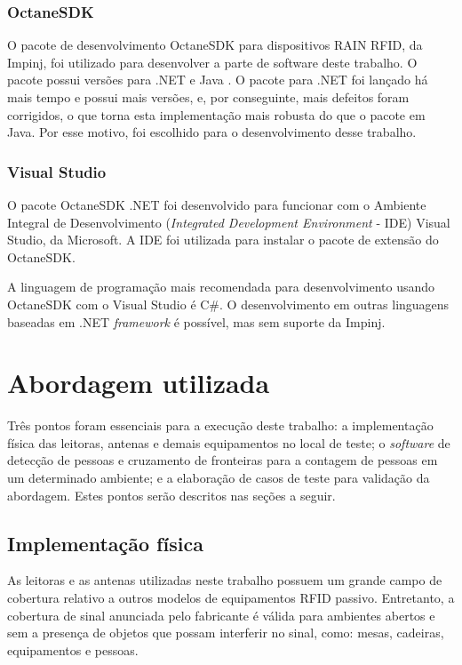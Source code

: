  \subsubsection{OctaneSDK}
 
 O pacote de desenvolvimento OctaneSDK para dispositivos RAIN RFID, da Impinj, foi utilizado para desenvolver a parte de software deste trabalho. O pacote possui versões para .NET e Java \cite{OctaneSDK}. O pacote para .NET foi lançado há mais tempo e possui mais versões, e, por conseguinte, mais defeitos foram corrigidos, o que torna esta implementação mais robusta do que o pacote em Java. Por esse motivo, foi escolhido para o desenvolvimento desse trabalho.
 
 \subsubsection{Visual Studio}
 
 O pacote OctaneSDK .NET foi desenvolvido para funcionar com o Ambiente Integral de Desenvolvimento (\textit{Integrated Development Environment} - IDE) Visual Studio, da Microsoft. A IDE foi utilizada para instalar o pacote de extensão do OctaneSDK. \cite{OctaneSDK}
 
 A linguagem de programação mais recomendada para desenvolvimento usando OctaneSDK com o Visual Studio é C\#. O desenvolvimento em outras linguagens baseadas em .NET \textit{framework} é possível, mas sem suporte da Impinj.

 
 \section{Abordagem utilizada}
 
 Três pontos foram essenciais para a execução deste trabalho: a implementação física das leitoras, antenas e demais equipamentos no local de teste; o \textit{software} de detecção de pessoas e cruzamento de fronteiras para a contagem de pessoas em um determinado ambiente;  e a elaboração de casos de teste para  validação da abordagem. Estes pontos serão descritos nas seções a seguir.
 
  
 \subsection{Implementação física}
 
 As leitoras e as antenas utilizadas neste trabalho possuem um grande campo de cobertura relativo a outros modelos de equipamentos RFID passivo. Entretanto, a cobertura de sinal anunciada pelo fabricante é válida para ambientes abertos e sem a presença de objetos que possam interferir no sinal, como: mesas, cadeiras, equipamentos e pessoas.
 
